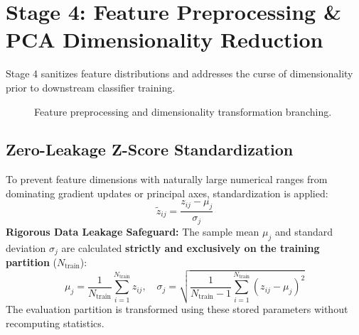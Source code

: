 \documentclass[a4paper, 11pt]{article}
\begin{document}
\section{Stage 4: Feature Preprocessing \& PCA Dimensionality Reduction}

Stage 4 sanitizes feature distributions and addresses the curse of dimensionality prior to downstream classifier training.

\begin{figure}[h!]
\centering
{}
\caption{Feature preprocessing and dimensionality transformation branching.}
\end{figure}

\subsection{Zero-Leakage Z-Score Standardization}
To prevent feature dimensions with naturally large numerical ranges from dominating gradient updates or principal axes, standardization is applied:
\begin{equation}
    \tilde{z}_{ij} = \frac{z_{ij} - \mu_j}{\sigma_j}
\end{equation}
\textbf{Rigorous Data Leakage Safeguard:} The sample mean $\mu_j$ and standard deviation $\sigma_j$ are calculated \textbf{strictly and exclusively on the training partition} ($N_{\text{train}}$):
\begin{equation}
    \mu_j = \frac{1}{N_{\text{train}}}\sum_{i=1}^{N_{\text{train}}} z_{ij}, \quad \sigma_j = \sqrt{\frac{1}{N_{\text{train}}-1}\sum_{i=1}^{N_{\text{train}}}(z_{ij} - \mu_j)^2}
\end{equation}
The evaluation partition is transformed using these stored parameters without recomputing statistics.
\end{document}
